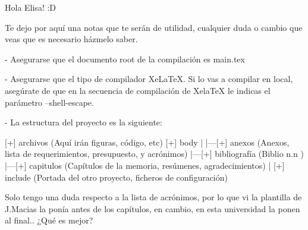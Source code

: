 
Hola Elisa! :D

Te dejo por aquí una notas que te serán de utilidad, cualquier duda o cambio que veas que es necesario házmelo saber.

   - Asegurarse que el documento root de la compilación es main.tex
   
   - Asegurarse que el tipo de compilador XeLaTeX. Si lo vas a compilar en local, asegúrate de que en la secuencia de compilación de XelaTeX le indicas el parámetro --shell-escape.
   
   - La estructura del proyecto es la siguiente:   

           [+] archivos (Aquí irán figuras, código, etc)
           [+] body
            |
            |---[+] anexos (Anexos, lista de requerimientos, presupuesto, y acrónimos)
            |---[+] bibliografía (Biblio n.n )
            |---[+] capitulos (Capítulos de la memoria, resúmenes, agradecimientos)
            |           
           [+] include (Portada del otro proyecto, ficheros de configuración)
           

Solo tengo una duda respecto a la lista de acrónimos, por lo que vi la plantilla de J.Macias la ponía antes de los capítulos, en cambio, en esta universidad la ponen al final.. ¿Qué es mejor?

